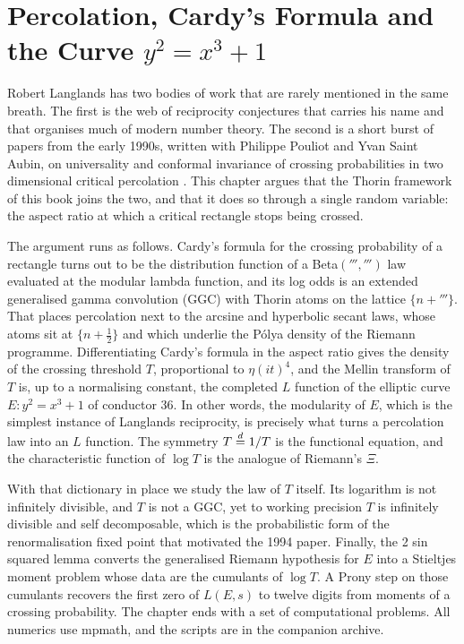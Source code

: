 \chapter[Percolation and the Curve \texorpdfstring{$y^2=x^3+1$}{y2 = x3 + 1}]{Percolation, Cardy's Formula and the Curve \texorpdfstring{$y^2=x^3+1$}{y2 = x3 + 1}}\label{ch:percolation}

Robert Langlands has two bodies of work that are rarely mentioned in the same breath. The first is the web of reciprocity conjectures that carries his name and that organises much of modern number theory. The second is a short burst of papers from the early 1990s, written with Philippe Pouliot and Yvan Saint Aubin, on universality and conformal invariance of crossing probabilities in two dimensional critical percolation \cite{lpps1992,lps1994}. This chapter argues that the Thorin framework of this book joins the two, and that it does so through a single random variable: the aspect ratio at which a critical rectangle stops being crossed.

The argument runs as follows. Cardy's formula for the crossing probability of a rectangle turns out to be the distribution function of a Beta$(\third,\third)$ law evaluated at the modular lambda function, and its log odds is an extended generalised gamma convolution (GGC) \cite{bondesson1992} with Thorin atoms on the lattice $\{n+\third\}$. That places percolation next to the arcsine and hyperbolic secant laws, whose atoms sit at $\{n+\tfrac12\}$ and which underlie the Pólya density of the Riemann programme. Differentiating Cardy's formula in the aspect ratio gives the density of the crossing threshold $T$, proportional to $\eta(it)^4$, and the Mellin transform of $T$ is, up to a normalising constant, the completed $L$ function of the elliptic curve $E: y^2 = x^3+1$ of conductor 36. In other words, the modularity of $E$, which is the simplest instance of Langlands reciprocity, is precisely what turns a percolation law into an $L$ function. The symmetry $T\overset{d}{=} 1/T$ is the functional equation, and the characteristic function of $\log T$ is the analogue of Riemann's $\Xi$.

With that dictionary in place we study the law of $T$ itself. Its logarithm is not infinitely divisible, and $T$ is not a GGC, yet to working precision $T$ is infinitely divisible and self decomposable, which is the probabilistic form of the renormalisation fixed point that motivated the 1994 paper. Finally, the 2 sin squared lemma converts the generalised Riemann hypothesis for $E$ into a Stieltjes moment problem whose data are the cumulants of $\log T$. A Prony step on those cumulants recovers the first zero of $L(E,s)$ to twelve digits from moments of a crossing probability. The chapter ends with a set of computational problems. All numerics use mpmath, and the scripts are in the companion archive.

